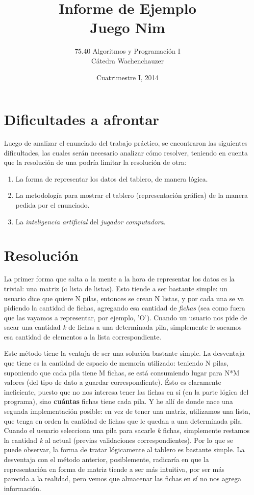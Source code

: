 \documentclass[a4paper,12pt]{article}
\title{Informe de Ejemplo \\ Juego Nim}
\author{75.40 Algoritmos y Programación I\\
Cátedra Wachenchauzer
}
\date{Cuatrimestre I, 2014}
\begin{document}
\maketitle
\thispagestyle{empty}
\newpage

\section{Dificultades a afrontar}

Luego de analizar el enunciado del trabajo práctico, se encontraron las siguientes dificultades, las cuales serán necesario analizar cómo resolver, teniendo en cuenta que la resolución de una podría limitar la resolución de otra:
\begin{enumerate}
	\item La forma de representar los datos del tablero, de manera lógica.
	\item La metodología para mostrar el tablero (representación gráfica) de la manera pedida por el enunciado.
	\item La \textit{inteligencia artificial} del \textit{jugador computadora}.
\end{enumerate}

\section{Resolución}

La primer forma que salta a la mente a la hora de representar los datos es la trivial: una matriz (o lista de listas). Esto tiende a ser bastante simple: un usuario dice que quiere N pilas, entonces se crean N listas, y por cada una se va pidiendo la cantidad de fichas, agregando esa cantidad de \textit{fichas} (sea como fuera que las vayamos a representar, por ejemplo, 'O'). Cuando un usuario nos pide de sacar una cantidad \textit{k} de fichas a una determinada pila, simplemente le sacamos esa cantidad de elementos a la lista correspondiente. 

Este método tiene la ventaja de ser una solución bastante simple. La desventaja que tiene es la cantidad de espacio de memoria utilizado: teniendo N pilas, suponiendo que cada pila tiene M fichas, se está consumiendo lugar para N*M valores (del tipo de dato a guardar correspondiente). Ésto es claramente ineficiente, puesto que no nos interesa tener las fichas en sí (en la parte lógica del programa), sino \textbf{cuántas} fichas tiene cada pila. Y he allí de donde nace una segunda implementación posible: en vez de tener una matriz, utilizamos una lista, que tenga en orden la cantidad de fichas que le quedan a una determinada pila. Cuando el usuario selecciona una pila para sacarle \textit{k} fichas, simplemente restamos la cantidad \textit{k} al actual (previas validaciones correspondientes). Por lo que se puede observar, la forma de tratar lógicamente al tablero es bastante simple. La desventaja con el método anterior, posiblemente, radicaría en que la representación en forma de matriz tiende a ser más intuitiva, por ser más parecida a la realidad, pero vemos que almacenar las fichas en sí no nos agrega información.\\
\end{document}
